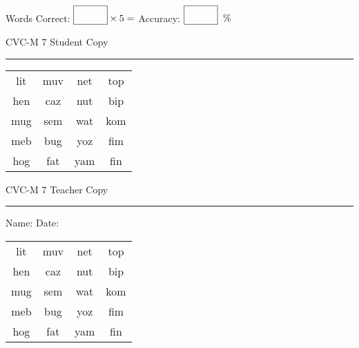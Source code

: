 \documentclass{memoir}
\begin{document}
\small

Words Correct: $\fbox{\phantom{\huge 100}} \times 5 = $ Accuracy: $\fbox{\phantom{\huge 100}}\;\; \%$ 

\vfill

\newpage


\footnotesize \noindent
CVC-M 7 \hfill Student Copy
\smallskip
\hrule

\Large

\setlength{\tabcolsep}{14pt}
\def\arraystretch{2}

{\selectfont


\begin{vplace}[0.5]
\begin{center}
\begin{tabular}{cccc}
lit & muv & net & top \\
hen & caz & nut & bip \\
mug & sem & wat & kom \\
meb & bug & yoz & fim \\
hog & fat & yam & fin \\
\end{tabular}
\end{center}
\end{vplace}

}

\newpage

\footnotesize \noindent
CVC-M 7 \hfill Teacher Copy
\smallskip
\hrule

\small

\vfill

\noindent
Name: \underline{\hspace{1.75in}} \hfill Date: \underline{\hspace{1in}}

\Large

{\selectfont


\begin{vplace}[0.5]
\begin{center}
\begin{tabular}{cccc}
lit & muv & net & top \\
hen & caz & nut & bip \\
mug & sem & wat & kom \\
meb & bug & yoz & fim \\
hog & fat & yam & fin \\
\end{tabular}
\end{center}
\end{vplace}



}
\end{document}
